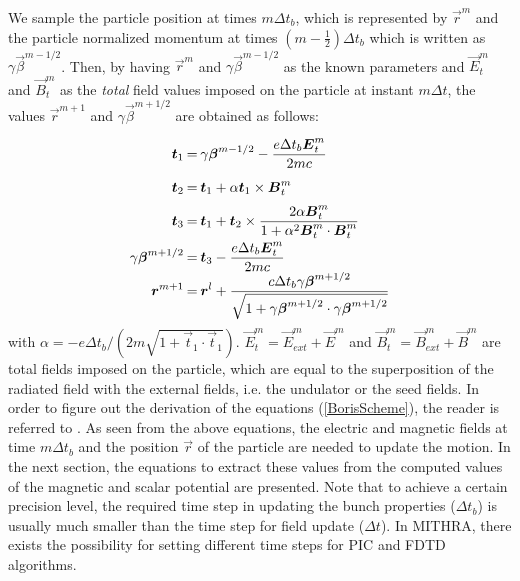 We sample the particle position at times $m\Delta t_b$, which is represented by $\vec{r}^m$ and the particle normalized momentum at times $(m-\frac{1}{2})\Delta t_b$ which is written as $\gamma \vec{\beta}^{m-1/2}$.
%
Then, by having $\vec{r}^m$ and $\gamma \vec{\beta}^{m-1/2}$ as the known parameters and $\vec{E}^m_t$ and $\vec{B}^m_t$ as the \emph{total} field values imposed on the particle at instant $m\Delta t$, the values $\vec{r}^{m+1}$ and $\gamma \vec{\beta}^{m+1/2}$ are obtained as follows:
%
\begin{equation}
\arraycolsep=1.0pt\def\arraystretch{2.0}
\label{BorisScheme}
\begin{array}{rcl}
\vec{t}_1 & = & \displaystyle \gamma \vec{\beta}^{m-1/2} - \frac{e\Delta t_b \vec{E}^m_t}{2mc} \\
\vec{t}_2 & = & \displaystyle \vec{t}_1 + \alpha \vec{t}_1 \times \vec{B}^m_t \\
\vec{t}_3 & = & \displaystyle \vec{t}_1 + \vec{t}_2 \times \frac{2 \alpha \vec{B}^m_t}{1+\alpha^2 \vec{B}^m_t \cdot \vec{B}^m_t} \\
\gamma \vec{\beta}^{m+1/2} & = & \displaystyle \vec{t}_3 - \frac{e\Delta t_b \vec{E}^m_t}{2mc} \\
\displaystyle \vec{r}^{m+1} & = & \displaystyle \vec{r}^l + \frac{c \Delta t_b \gamma \vec{\beta}^{m+1/2} }{\sqrt{1+\gamma \vec{\beta}^{m+1/2} \cdot \gamma \vec{\beta}^{m+1/2} } }
\end{array}
\end{equation}
%
with $\alpha = -e\Delta t_b / (2 m \sqrt{1+\vec{t}_1 \cdot \vec{t}_1})$.
%
$\vec{E}^m_t = \vec{E}^m_{ext} + \vec{E}^m$ and $\vec{B}^m_t = \vec{B}^m_{ext} + \vec{B}^m$ are total fields imposed on the particle, which are equal to the superposition of the radiated field with the external fields, i.e. the undulator or the seed fields.
%
In order to figure out the derivation of the equations (\ref{BorisScheme}), the reader is referred to \cite{boris1,boris2}.
%
As seen from the above equations, the electric and magnetic fields at time $m \Delta t_b$ and the position $\vec{r}$ of the particle are needed to update the motion.
%
In the next section, the equations to extract these values from the computed values of the magnetic and scalar potential are presented.
%
Note that to achieve a certain precision level, the required time step in updating the bunch properties ($\Delta t_b$) is usually much smaller than the time step for field update ($\Delta t$).
%
In MITHRA, there exists the possibility for setting different time steps for PIC and FDTD algorithms.

